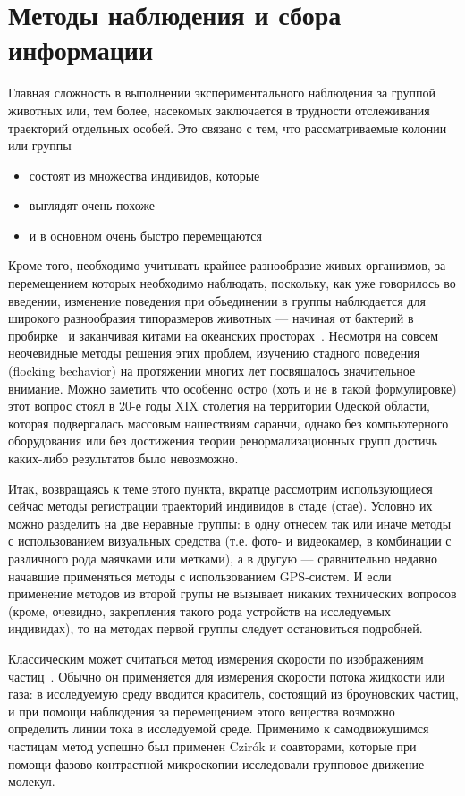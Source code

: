 \section{Методы наблюдения и сбора информации} %
\label{sec:ExperimentalMethods}
	Главная сложность в выполнении экспериментального наблюдения за группой животных или, тем более, насекомых заключается в трудности отслеживания траекторий отдельных особей. Это связано с тем, что рассматриваемые колонии или группы
	\begin{itemize}
		\item  состоят из множества индивидов, которые
		\item выглядят очень похоже
		\item и в основном очень быстро перемещаются
	\end{itemize}
	Кроме того, необходимо учитывать крайнее разнообразие живых организмов, за перемещением которых необходимо наблюдать, поскольку, как уже говорилось во введении, изменение поведения при обьединении в группы наблюдается для широкого разнообразия типоразмеров животных --- начиная от бактерий в пробирке~\cite{csahok1997,keller1971} и заканчивая китами на океанских просторах~\cite{makris2009}.
	Несмотря на совсем неочевидные методы решения этих проблем, изучению стадного поведения (flocking bechavior) на протяжении многих лет посвящалось значительное внимание. Можно заметить что особенно остро (хоть и не в такой формулировке) этот вопрос стоял в 20-е годы XIX столетия на территории Одеской области, которая подвергалась массовым нашествиям саранчи, однако без компьютерного оборудования или без достижения теории ренормализационных групп достичь каких-либо результатов было невозможно.

	Итак, возвращаясь к теме этого пункта, вкратце рассмотрим использующиеся сейчас методы регистрации траекторий индивидов в стаде (стае). Условно их можно разделить на две неравные группы: в одну отнесем так или иначе методы с использованием визуальных средства (т.е. фото- и видеокамер, в комбинации с различного рода маячками или метками), а в другую --- сравнительно недавно начавшие применяться методы с использованием GPS-систем. И если применение методов из второй групы не вызывает никаких технических вопросов (кроме, очевидно, закрепления такого рода устройств на исследуемых индивидах), то на методах первой группы следует остановиться подробней.

	Классическим может считаться метод измерения скорости по изображениям частиц~\cite{raffel2007}. Обычно он применяется для измерения скорости потока жидкости или газа: в исследуемую среду вводится краситель, состоящий из броуновских частиц, и при помощи наблюдения за перемещением этого вещества возможно определить линии тока в исследуемой среде. Применимо к самодвижущимся частицам метод успешно был применен  Czir\'{o}k и соавторами\cite{csahok1997}, которые при помощи фазово-контрастной микроскопии исследовали групповое движение молекул.

